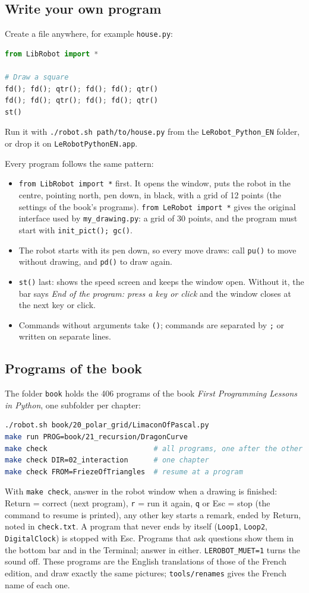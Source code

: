 \documentclass[11pt,a4paper]{article}
\newcommand{\kbd}[1]{\texttt{#1}}
\begin{document}
\subsection{Write your own program}
Create a file anywhere, for example \kbd{house.py}:
\begin{lstlisting}[language=Python]
from LibRobot import *

# Draw a square
fd(); fd(); qtr(); fd(); fd(); qtr()
fd(); fd(); qtr(); fd(); fd(); qtr()
st()
\end{lstlisting}
Run it with \kbd{./robot.sh path/to/house.py} from the
\kbd{LeRobot\_Python\_EN} folder, or drop it on \kbd{LeRobotPythonEN.app}.

Every program follows the same pattern:
\begin{itemize}
\item \kbd{from LibRobot import *} first. It opens the window, puts the
  robot in the centre, pointing north, pen down, in black, with a grid of
  12 points (the settings of the book's programs). \kbd{from LeRobot import *}
  gives the original interface used by \kbd{my\_drawing.py}: a grid of 30
  points, and the program must start with \kbd{init\_pict(); gc()}.
\item The robot starts with its pen down, so every move draws: call
  \kbd{pu()} to move without drawing, and \kbd{pd()} to draw again.
\item \kbd{st()} last: shows the speed screen and keeps the window open.
  Without it, the bar says \emph{End of the program: press a key or click}
  and the window closes at the next key or click.
\item Commands without arguments take \kbd{()}; commands are separated by
  \kbd{;} or written on separate lines.
\end{itemize}

\subsection{Programs of the book}
The folder \kbd{book} holds the 406 programs of the book \emph{First
Programming Lessons in Python}, one subfolder per chapter:
\begin{lstlisting}[language=bash]
./robot.sh book/20_polar_grid/LimaconOfPascal.py
make run PROG=book/21_recursion/DragonCurve
make check                         # all programs, one after the other
make check DIR=02_interaction      # one chapter
make check FROM=FriezeOfTriangles  # resume at a program
\end{lstlisting}
With \kbd{make check}, answer in the robot window when a drawing is
finished: Return = correct (next program), \kbd{r} = run it again, \kbd{q}
or Esc = stop (the command to resume is printed), any other key starts a
remark, ended by Return, noted in \kbd{check.txt}. A program that never
ends by itself (\kbd{Loop1}, \kbd{Loop2}, \kbd{DigitalClock}) is stopped
with Esc. Programs that ask questions show them in the bottom bar and in
the Terminal; answer in either. \kbd{LEROBOT\_MUET=1} turns the sound off.
These programs are the English translations of those of the French
edition, and draw exactly the same pictures; \kbd{tools/renames} gives the
French name of each one.
\end{document}
